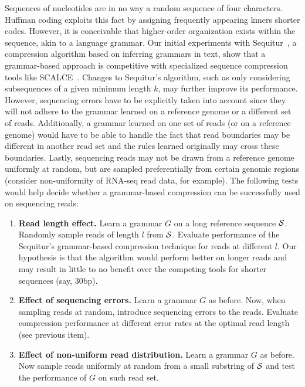 \documentclass[12pt]{cmuthesis}
\begin{document}
  Sequences of nucleotides are in no way a random sequence of four characters. Huffman coding exploits this fact by assigning frequently appearing kmers shorter codes. However, it is conceivable that higher-order organization exists within the sequence, akin to a language grammar. Our initial experiments with Sequitur~\cite{Sequitur}, a compression algorithm based on inferring grammars in text, show that a grammar-based approach is competitive with specialized sequence compression tools like SCALCE~\cite{Sahinalp2012}. Changes to Sequitur's algorithm, such as only considering subsequences of a given minimum length $k$, may further improve its performance. However, sequencing errors have to be explicitly taken into account since they will not adhere to the grammar learned on a reference genome or a different set of reads. Additionally, a grammar learned on one set of reads (or on a reference genome) would have to be able to handle the fact that read boundaries may be different in another read set and the rules learned originally may cross these boundaries. Lastly, sequencing reads may not be drawn from a reference genome uniformly at random, but are sampled preferentially from certain genomic regions (consider non-uniformity of RNA-seq read data, for example). The following tests would help decide whether a grammar-based compression can be successfully used on sequencing reads:
  \begin{enumerate}
    \item \textbf{Read length effect.} Learn a grammar $G$ on a long reference sequence $\mathcal{S}$. Randomly sample reads of length $l$ from $\mathcal{S}$. Evaluate performance of the Sequitur's grammar-based compression technique for reads at different $l$. Our hypothesis is that the algorithm would perform better on longer reads and may result in little to no benefit over the competing tools for shorter sequences (say, 30bp).

    \item \textbf{Effect of sequencing errors.} Learn a grammar $G$ as before. Now, when sampling reads at random, introduce sequencing errors to the reads. Evaluate compression performance at different error rates at the optimal read length (see previous item).

    \item \textbf{Effect of non-uniform read distribution.} Learn a grammar $G$ as before. Now sample reads uniformly at random from a small substring of $\mathcal{S}$ and test the performance of $G$ on such read set.
  \end{enumerate}
\end{document}
